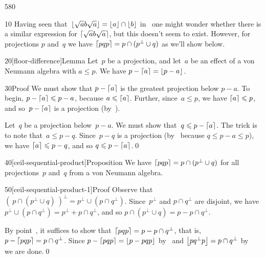 \begin{parsec}{580}%
\begin{point}{10}%
Having seen that~$\left\lfloor\sqrt{a}b\sqrt{a}\right\rfloor = \left\lfloor a\right\rfloor\cap\left\lfloor b\right\rfloor$
in~
one might wonder whether
there is a similar expression for $\left\lceil\sqrt{a}b\sqrt{a}\right\rceil$,
but this doesn't seem to exist.
However,
for projections
$p$ and~$q$
we have
$\left\lceil pqp\right\rceil= p\cap (p^\perp \cup q)$
as we'll show below.
\end{point}
\begin{point}{20}[floor-difference]{Lemma}%
Let~$p$ be a projection,
and let~$a$ be an effect of a von Neumann algebra
with $a\leq p$.
We have $p-\left\lceil a\right\rceil=\left\lfloor p-a\right\rfloor$.
\begin{point}{30}{Proof}%
We must show that $p-\left\lceil a\right\rceil$ is the greatest projection below $p-a$.
To begin, $p-\left\lceil a\right\rceil\leqslant p-a$,
because $a\leqslant \left\lceil a\right\rceil$.
Further, since~$a\leq p$, we have $\left\lceil a\right\rceil\leqslant p$,
and so~$p-\left\lceil a\right\rceil$ is a projection
(by~).

Let~$q$ be a projection below~$p-a$.
We must show that~$q\leqslant p-\left\lceil a\right\rceil$.
The trick is to note that~$a\leq p-q$.
Since~$p-q$ is a projection (by~
because $q\leq p-a\leq p$),
we have $\left\lceil a\right\rceil\leqslant p-q$,
and so $q\leqslant p-\left\lceil a\right\rceil$.\qed
\end{point}
\end{point}
\begin{point}{40}[ceil-sequential-product]{Proposition}%
We have $\left\lceil pqp\right\rceil=p\cap (p^\perp \cup q)$
for all projections~$p$ and~$q$ from a von Neumann algebra.
\begin{point}{50}[ceil-sequential-product-1]{Proof}%
Observe that $(\ p\cap (p^\perp \cup q)\ )^\perp 
= p^\perp \cup(p\cap q^\perp)$.
Since~$p^\perp$ and $p\cap q^\perp$ are disjoint,
we have $p^\perp \cup (p\cap q^\perp) = p^\perp + p\cap q^\perp$,
and so $p\cap (p^\perp \cup q) = p-p\cap q^\perp$.

By point~, 
it suffices to show that~$\left\lceil pqp\right\rceil=p- p\cap q^\perp$,
that is, $p-\left\lceil pqp\right\rceil=p\cap q^\perp$.
Since $p-\left\lceil pqp\right\rceil = \left\lfloor p-pqp\right\rfloor$
by~ and $\left\lfloor pq^\perp p\right\rfloor=p\cap q^\perp$
by~ we are done.\qed
\end{point}
\end{point}
\end{parsec}
